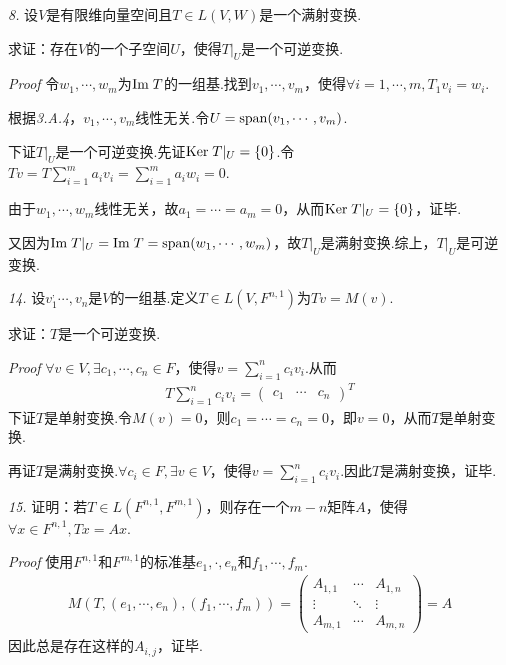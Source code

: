 \newpage

\textit{8.}
设\(V\)是有限维向量空间且\(T \in L(V,W)\)是一个满射变换.

求证：存在\(V\)的一个子空间\(U\)，使得\(T|_U\)是一个可逆变换.

\textit{Proof}
令\(w_1,\cdots,w_m\)为\(\mathrm{Im \;} T\)的一组基.找到\(v_1,\cdots,v_m\)，使得\(\forall i=1,\cdots,m,T_1v_i=w_i\).

根据\textit{3.A.4}，\(v_1,\cdots,v_m\)线性无关.令\(U=\mathrm{span} (v_1,\cdots,v_m)\).

下证\(T|_U\)是一个可逆变换.先证\(\mathrm{Ker \;} T|_U=\{0\}\).令\(Tv=T\sum_{i=1}^m a_iv_i=\sum_{i=1}^m a_iw_i=0\).

由于\(w_1,\cdots,w_m\)线性无关，故\(a_1=\cdots=a_m=0\)，从而\(\mathrm{Ker \;} T|_U=\{0\}\)，证毕.

又因为\(\mathrm{Im \;} T|_U=\mathrm{Im \;} T=\mathrm{span} (w_1,\cdots,w_m)\)，故\(T|_U\)是满射变换.综上，\(T|_U\)是可逆变换.

\hspace*{\fill}

\textit{14.}
设\(v_1^,\cdots,v_n\)是\(V\)的一组基.定义\(T \in L(V,F^{n,1})\)为\(Tv=M(v)\).

求证：\(T\)是一个可逆变换.

\textit{Proof}
\(\forall v \in V,\exists c_1,\cdots,c_n \in F\)，使得\(v=\sum_{i=1}^n c_iv_i\).从而
    \begin{align*}
        T\sum_{i=1}^n c_iv_i=
            \begin{pmatrix}
                c_1 & \cdots & c_n
            \end{pmatrix}^T
    \end{align*}
下证\(T\)是单射变换.令\(M(v)=0\)，则\(c_1=\cdots=c_n=0\)，即\(v=0\)，从而\(T\)是单射变换.

再证\(T\)是满射变换.\(\forall c_i \in F,\exists v \in V\)，使得\(v=\sum_{i=1}^n c_iv_i\).因此\(T\)是满射变换，证毕.

\hspace*{\fill}

\textit{15.}
证明：若\(T \in L(F^{n,1},F^{m,1})\)，则存在一个\(m-n\)矩阵\(A\)，使得\(\forall x \in F^{n,1},Tx=Ax\).

\textit{Proof}
使用\(F^{n,1}\)和\(F^{m,1}\)的标准基\(e_1,\cdot,e_n\)和\(f_1,\cdots,f_m\).
    \begin{align*}
        M(T,(e_1,\cdots,e_n),(f_1,\cdots,f_m))=
            \begin{pmatrix}
                A_{1,1} & \cdots & A_{1,n}  \\
                \vdots  & \ddots & \vdots   \\
                A_{m,1} & \cdots & A_{m,n}
            \end{pmatrix}
        =A
    \end{align*}
因此总是存在这样的\(A_{i,j}\)，证毕.

